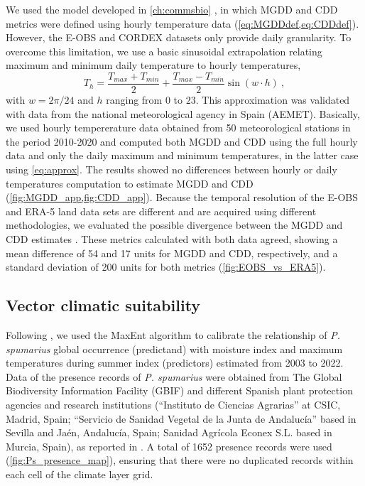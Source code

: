 We used the model developed in \cref{ch:commsbio}
\cite{GimenezRomero2022_CommsBio}, in which MGDD and CDD metrics were defined
using hourly temperature data (\cref{eq:MGDDdef,eq:CDDdef}). However, the E-OBS
and CORDEX datasets only provide daily granularity. To overcome this
limitation, we use a basic sinusoidal extrapolation relating maximum and
minimum daily temperature to hourly temperatures,
\begin{equation}\label{eq:approx}
    T_h=\frac{T_{max}+T_{min}}{2} + \frac{T_{max}-T_{min}}{2}\sin(w\cdot h)
    \ ,
\end{equation}
with $w=2\pi/24$ and $h$ ranging from $0$ to $23$. This approximation was
validated with data from the national meteorological agency in Spain (AEMET).
Basically, we used hourly tempererature data obtained from 50 meteorological
stations in the period 2010-2020 and computed both MGDD and CDD using the full
hourly data and only the daily maximum and minimum temperatures, in the latter
case using \cref{eq:approx}. The results showed no differences between hourly
or daily temperatures computation to estimate MGDD and CDD
(\cref{fig:MGDD_app,fig:CDD_app}). Because the temporal resolution
of the E-OBS and ERA-5 land data sets are different and are acquired using
different methodologies, we evaluated the possible divergence between the MGDD
and CDD estimates  \cite{GimenezRomero2022_CommsBio}. These metrics calculated
with both data agreed, showing a mean difference of 54 and 17 units for MGDD
and CDD, respectively, and a standard deviation of 200 units for both metrics
(\cref{fig:EOBS_vs_ERA5}).

\subsection{Vector climatic suitability}

Following \cite{Godefroid2022_vector}, we used the MaxEnt
\cite{phillips_maximum_2006} algorithm to calibrate the relationship of
\textit{P. spumarius} global occurrence (predictand) with moisture index and
maximum temperatures during summer index (predictors) estimated from 2003 to
2022. Data of the presence records of \textit{P. spumarius} were obtained from
The Global Biodiversity Information Facility (GBIF)
\cite{noauthor_what_nodate,GBIF} and different Spanish plant
protection agencies and research institutions (``Instituto de Ciencias
Agrarias'' at CSIC, Madrid, Spain; ``Servicio de Sanidad Vegetal de la Junta de
Andalucía'' based in Sevilla and Jaén, Andalucía, Spain; Sanidad Agrícola
Econex S.L. based in Murcia, Spain), as reported in
\cite{Godefroid2022_vector}. A total of 1652 presence records were used
(\cref{fig:Ps_presence_map}), ensuring that there were no duplicated records
within each cell of the climate layer grid.

